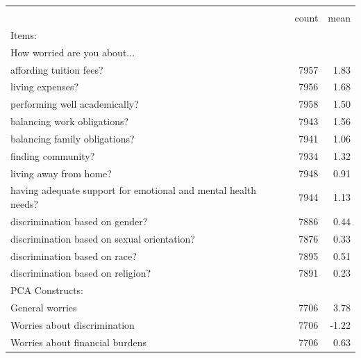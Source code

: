 \begin{tabular}{lrr}
\toprule
                    &\multicolumn{2}{c}{}     \\
                    &       count&        mean\\
\midrule
Items: &&\\
How worried are you about... &&\\
\quad affording tuition fees?&        7957&        1.83\\
\quad living expenses?&        7956&        1.68\\
\quad performing well academically?&        7958&        1.50\\
\quad balancing work obligations?&        7943&        1.56\\
\quad balancing family obligations?&        7941&        1.06\\
\quad finding community?&        7934&        1.32\\
\quad living away from home?&        7948&        0.91\\
\quad having adequate support for emotional and mental health needs?&        7944&        1.13\\
\quad discrimination based on gender?&        7886&        0.44\\
\quad discrimination based on sexual orientation?&        7876&        0.33\\
\quad discrimination based on race?&        7895&        0.51\\
\quad discrimination based on religion?&        7891&        0.23\\
\midrule 
PCA Constructs: && \\
\quad General worries    &        7706&        3.78\\
\quad Worries about discrimination&        7706&       -1.22\\
\quad Worries about financial burdens&        7706&        0.63\\
\bottomrule
\end{tabular}
